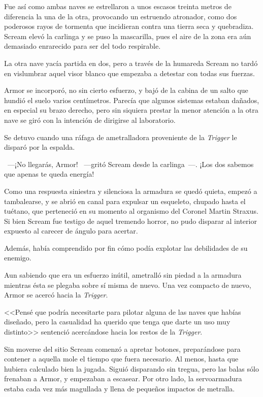 Fue así como ambas naves se estrellaron a unos escasos treinta metros de diferencia la una de la otra, provocando un estruendo atronador, como dos poderosos rayos de tormenta que incidieran contra una tierra seca y quebradiza. Scream elevó la carlinga y se puso la mascarilla, pues el aire de la zona era aún demasiado enrarecido para ser del todo respirable.

La otra nave yacía partida en dos, pero a través de la humareda Scream no tardó en vislumbrar aquel visor blanco que empezaba a detestar con todas sus fuerzas.

Armor se incorporó, no sin cierto esfuerzo, y bajó de la cabina de un salto que hundió el suelo varios centímetros. Parecía que algunos sistemas estaban dañados, en especial su brazo derecho, pero sin siquiera prestar la menor atención a la otra nave se giró con la intención de dirigirse al laboratorio.

Se detuvo cuando una ráfaga de ametralladora proveniente de la \emph{Trigger} le disparó por la espalda.

~---¡No llegarás, Armor! ~---gritó Scream desde la carlinga~---. ¡Los dos sabemos que apenas te queda energía!

Como una respuesta siniestra y silenciosa la armadura se quedó quieta, empezó a tambalearse, y se abrió en canal para expulsar un esqueleto, chupado hasta el tuétano, que perteneció en su momento al organismo del Coronel Martin Straxus. Si bien Scream fue testigo de aquel tremendo horror, no pudo disparar al interior expuesto al carecer de ángulo para acertar.

Además, había comprendido por fin cómo podía explotar las debilidades de su enemigo.

Aun sabiendo que era un esfuerzo inútil, ametralló sin piedad a la armadura mientras ésta se plegaba sobre sí misma de nuevo. Una vez compacto de nuevo, Armor se acercó hacia la \emph{Trigger}.

<<Pensé que podría necesitarte para pilotar alguna de las naves que habías diseñado, pero la casualidad ha querido que tenga que darte un uso muy distinto>> sentenció acercándose hacia los restos de la \emph{Trigger}.

Sin moverse del sitio Scream comenzó a apretar botones, preparándose para contener a aquella mole el tiempo que fuera necesario. Al menos, hasta que hubiera calculado bien la jugada. Siguió disparando sin tregua, pero las balas sólo frenaban a Armor, y empezaban a escasear. Por otro lado, la servoarmadura estaba cada vez más magullada y llena de pequeños impactos de metralla.

